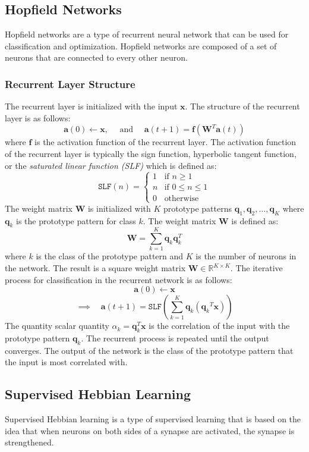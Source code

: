 \subsection{Hopfield Networks}
Hopfield networks are a type of recurrent neural network that can be used for classification and optimization. Hopfield networks are composed of a set of neurons that are connected to every other neuron. 
\subsubsection{Recurrent Layer Structure}
The recurrent layer is initialized with the input \(\mathbf{x}\). The structure of the recurrent layer is as follows:
\[\mathbf{a}(0)\gets\mathbf{x},\quad\text{ and }\quad\mathbf{a}(t+1)=\mathbf{f}\left(\mathbf{W}^T\mathbf{a}(t)\right)\]
where \(\mathbf{f}\) is the activation function of the recurrent layer. The activation function of the recurrent layer is typically the sign function, hyperbolic tangent function, or the \emph{saturated linear function (SLF)} which is defined as:
\[\texttt{SLF}(n)=\begin{cases}
    1 & \text{if } n\geq 1\\
    n & \text{if } 0\leq n\leq 1\\
    0 & \text{otherwise}
\end{cases}\]
The weight matrix \(\mathbf{W}\) is initialized with \(K\) prototype patterns \(\mathbf{q}_1,\mathbf{q}_2,\dots,\mathbf{q}_K\) where \(\mathbf{q}_k\) is the prototype pattern for class \(k\). The weight matrix \(\mathbf{W}\) is defined as:
\[\mathbf{W}=\sum_{k=1}^K\mathbf{q}_k{\mathbf{q}}_k^T\]
where \(k\) is the class of the prototype pattern and \(K\) is the number of neurons in the network. The result is a square weight matrix \(\mathbf{W}\in\mathbb{R}^{K\times K}\). The iterative process for classification in the recurrent network is as follows:
\[\mathbf{a}(0)\gets\mathbf{x}\] 
\[\implies\quad\mathbf{a}(t+1)=\texttt{SLF}\left(\sum_{k=1}^K\mathbf{q}_k({\mathbf{q}_k}^T\mathbf{x})\right)\]
The quantity scalar quantity \(\alpha_k=\mathbf{q}_k^T\mathbf{x}\) is the correlation of the input with the prototype pattern \(\mathbf{q}_k\). The recurrent process is repeated until the output converges. The output of the network is the class of the prototype pattern that the input is most correlated with. 
\subsection{Supervised Hebbian Learning}
Supervised Hebbian learning is a type of supervised learning that is based on the idea that when neurons on both sides of a synapse are activated, the synapse is strengthened. 

